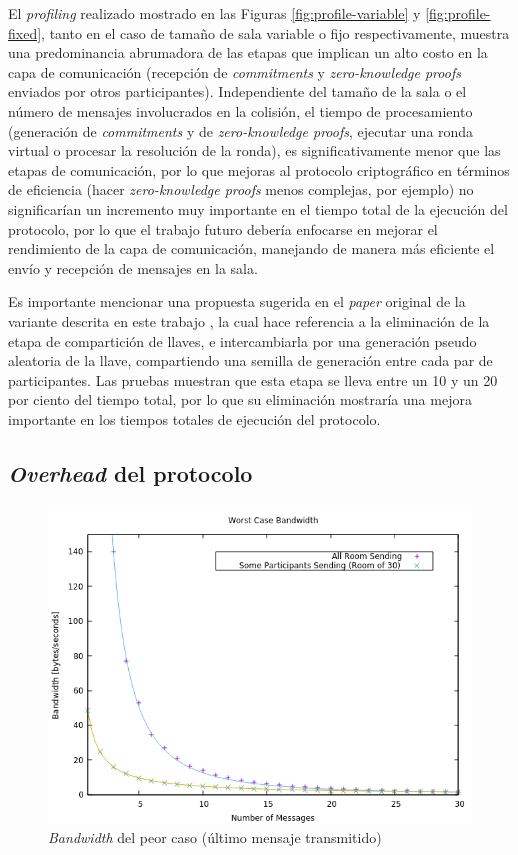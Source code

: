 El \emph{profiling} realizado mostrado en las Figuras 
\ref{fig:profile-variable} y \ref{fig:profile-fixed}, tanto en el caso de 
tamaño de sala variable o fijo respectivamente, muestra una 
predominancia abrumadora de las etapas que implican un alto costo en la 
capa de comunicación (recepción de \emph{commitments} y 
\emph{zero-knowledge proofs} enviados por otros participantes). 
Independiente del tamaño de la sala o el número de mensajes involucrados 
en la colisión, el tiempo de procesamiento (generación de 
\emph{commitments} y de \emph{zero-knowledge proofs}, ejecutar una ronda 
virtual o procesar la resolución de la ronda), es significativamente menor 
que las etapas de comunicación, por lo que mejoras al protocolo 
criptográfico en términos de eficiencia (hacer \emph{zero-knowledge proofs}
menos complejas, por ejemplo) no significarían un incremento muy 
importante en el tiempo total de la ejecución del protocolo, por lo que el 
trabajo futuro debería enfocarse en mejorar el rendimiento de la capa de 
comunicación, manejando de manera más eficiente el envío y recepción de 
mensajes en la sala.

Es importante mencionar una propuesta sugerida en 
el \emph{paper} original de la variante descrita en este trabajo 
\cite{franck2014dining}, la cual hace referencia a la eliminación de la etapa 
de compartición de llaves, e intercambiarla por una generación pseudo 
aleatoria de la llave, compartiendo una semilla de generación entre cada 
par de participantes. Las pruebas muestran que esta etapa se lleva entre 
un 10 y un 20 por ciento del tiempo total, por lo que su eliminación 
mostraría una mejora importante en los tiempos totales de ejecución del 
protocolo.

\subsection{\emph{Overhead} del protocolo}

\begin{figure}[H]
  \centering
    \includegraphics[scale=0.7]{logs/bandwidth.png}
  \caption{\emph{Bandwidth} del peor caso (último mensaje transmitido)}
  \label{fig:bandwidth}
\end{figure}

